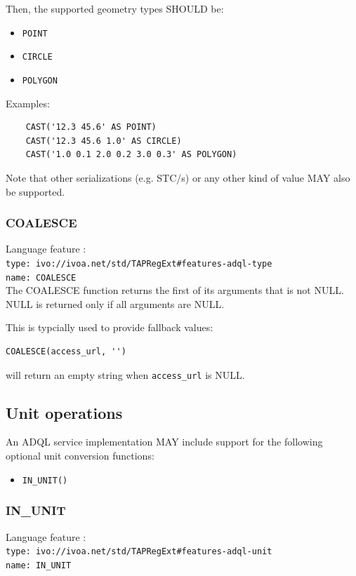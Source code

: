 \documentclass[11pt,a4paper]{ivoa}
\begin{document}
Then, the supported geometry types SHOULD be:

\begin{itemize}
    \item \verb:POINT:
    \item \verb:CIRCLE:
    \item \verb:POLYGON:
\end{itemize}

Examples:

\begin{verbatim}
    CAST('12.3 45.6' AS POINT)
    CAST('12.3 45.6 1.0' AS CIRCLE)
    CAST('1.0 0.1 2.0 0.2 3.0 0.3' AS POLYGON)
\end{verbatim}

Note that other serializations (e.g. STC/s) or any other kind of value MAY also
be supported.

\subsubsection{COALESCE}
{\footnotesize Language feature :}\\
{\footnotesize \verb|type: ivo://ivoa.net/std/TAPRegExt#features-adql-type|}\\
{\footnotesize \verb|name: COALESCE|}\\

The COALESCE function returns the first of its arguments that is not
NULL. NULL is returned only if all arguments are NULL. 

This is typcially used to provide fallback values:

\begin{verbatim}
COALESCE(access_url, '')
\end{verbatim}

will return an empty string when \verb|access_url| is NULL.


\subsection{Unit operations}
\label{sec:unit}

An ADQL service implementation MAY include support for the following optional
unit conversion functions:

\begin{itemize}
    \item \verb:IN_UNIT():
\end{itemize}

\subsubsection{IN\_UNIT}
\label{sec:unit.in_unit}
{\footnotesize Language feature :}\\
{\footnotesize \verb|type: ivo://ivoa.net/std/TAPRegExt#features-adql-unit|}\\
{\footnotesize \verb|name: IN_UNIT|}\\
\end{document}
